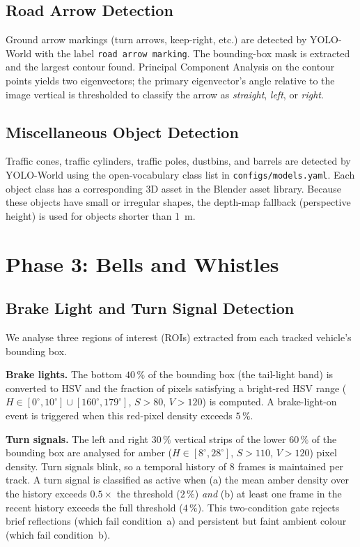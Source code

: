 \documentclass[conference]{IEEEtran}
\begin{document}
\subsection{Road Arrow Detection}

Ground arrow markings (turn arrows, keep-right, etc.) are detected by
YOLO-World with the label \texttt{road arrow marking}.  The bounding-box mask
is extracted and the largest contour found.  Principal Component Analysis on
the contour points yields two eigenvectors; the primary eigenvector's angle
relative to the image vertical is thresholded to classify the arrow as
\emph{straight}, \emph{left}, or \emph{right}.

\subsection{Miscellaneous Object Detection}

Traffic cones, traffic cylinders, traffic poles, dustbins, and barrels are
detected by YOLO-World using the open-vocabulary class list in
\texttt{configs/models.yaml}.  Each object class has a corresponding 3D
asset in the Blender asset library.  Because these objects have small or
irregular shapes, the depth-map fallback (perspective height) is used for
objects shorter than 1~m.

\section{Phase 3: Bells and Whistles}

\subsection{Brake Light and Turn Signal Detection}

We analyse three regions of interest (ROIs) extracted from each tracked
vehicle's bounding box.

\textbf{Brake lights.}
The bottom $40\,\%$ of the bounding box (the tail-light band) is converted
to HSV and the fraction of pixels satisfying a bright-red HSV range
($H \in [0^\circ,10^\circ]\cup[160^\circ,179^\circ]$, $S > 80$,
$V > 120$) is computed.  A brake-light-on event is triggered when this
red-pixel density exceeds $5\,\%$.

\textbf{Turn signals.}
The left and right $30\,\%$ vertical strips of the lower $60\,\%$ of the
bounding box are analysed for amber ($H \in [8^\circ,28^\circ]$, $S > 110$,
$V > 120$) pixel density.  Turn signals blink, so a temporal history of 8
frames is maintained per track.  A turn signal is classified as active when
(a) the mean amber density over the history exceeds $0.5\times$ the threshold
($2\,\%$) \emph{and} (b) at least one frame in the recent history exceeds the
full threshold ($4\,\%$).  This two-condition gate rejects brief reflections
(which fail condition~a) and persistent but faint ambient colour (which fail
condition~b).
\end{document}
